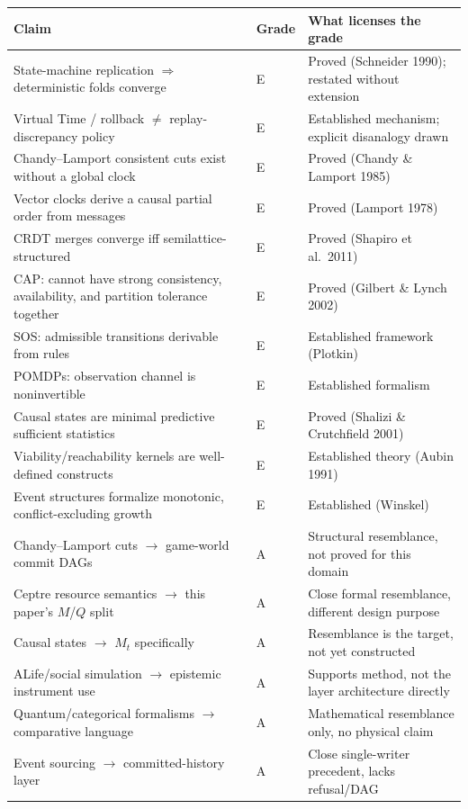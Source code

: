 \documentclass[11pt]{article}
\begin{document}
\begin{table}[h]
\centering
\small
\begin{tabular}{p{5.2cm}p{1.3cm}p{6.8cm}}
\toprule
\textbf{Claim} & \textbf{Grade} & \textbf{What licenses the grade} \\
\midrule
State-machine replication $\Rightarrow$ deterministic folds converge & E & Proved (Schneider 1990); restated without extension \\
Virtual Time / rollback $\neq$ replay-discrepancy policy & E & Established mechanism; explicit disanalogy drawn \\
Chandy--Lamport consistent cuts exist without a global clock & E & Proved (Chandy \& Lamport 1985) \\
Vector clocks derive a causal partial order from messages & E & Proved (Lamport 1978) \\
CRDT merges converge iff semilattice-structured & E & Proved (Shapiro et al.\ 2011) \\
CAP: cannot have strong consistency, availability, and partition tolerance together & E & Proved (Gilbert \& Lynch 2002) \\
SOS: admissible transitions derivable from rules & E & Established framework (Plotkin) \\
POMDPs: observation channel is noninvertible & E & Established formalism \\
Causal states are minimal predictive sufficient statistics & E & Proved (Shalizi \& Crutchfield 2001) \\
Viability/reachability kernels are well-defined constructs & E & Established theory (Aubin 1991) \\
Event structures formalize monotonic, conflict-excluding growth & E & Established (Winskel) \\
Chandy--Lamport cuts $\to$ game-world commit DAGs & A & Structural resemblance, not proved for this domain \\
Ceptre resource semantics $\to$ this paper's $M$/$Q$ split & A & Close formal resemblance, different design purpose \\
Causal states $\to$ $M_t$ specifically & A & Resemblance is the target, not yet constructed \\
ALife/social simulation $\to$ epistemic instrument use & A & Supports method, not the layer architecture directly \\
Quantum/categorical formalisms $\to$ comparative language & A & Mathematical resemblance only, no physical claim \\
Event sourcing $\to$ committed-history layer & A & Close single-writer precedent, lacks refusal/DAG \\

\end{tabular}
\end{table}
\end{document}

